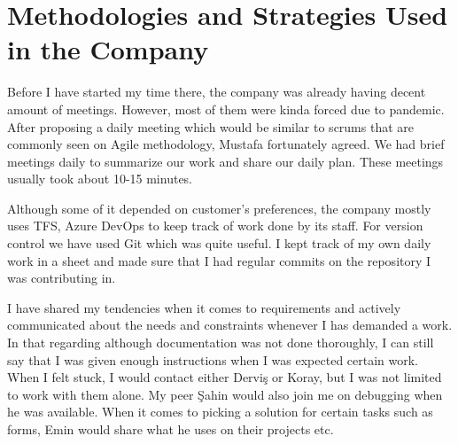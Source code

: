\section{Methodologies and Strategies Used in the Company}
Before I have started my time there, the company was already having decent 
amount of meetings. However, most of them were kinda forced due to pandemic. 
After proposing a daily meeting which would be similar to scrums that are 
commonly seen on Agile methodology, Mustafa fortunately agreed. We had 
brief meetings daily to summarize our work and share our daily plan. These 
meetings usually took about 10-15 minutes.
\par
Although some of it depended on customer's preferences, the company mostly 
uses TFS, Azure DevOps to keep track of work done by its staff. For version 
control we have used Git which was quite useful. I kept track of my own 
daily work in a sheet and made sure that I had regular commits on the 
repository I was contributing in.
\par
I have shared my tendencies when it comes to requirements and actively 
communicated about the needs and constraints whenever I has demanded a work. 
In that regarding although documentation was not done thoroughly, I can still 
say that I was given enough instructions when I was expected certain work. 
When I felt stuck, I would contact either Derviş or Koray, but I was not 
limited to work with them alone. My peer Şahin would also join me on debugging 
when he was available. When it comes to picking a solution for certain tasks 
such as forms, Emin would share what he uses on their projects etc.
